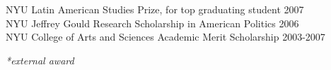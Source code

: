 \documentclass[11pt]{article}
\begin{document}
	\begin{minipage}[t]{.21\textwidth}
	  \so{ }
	\end{minipage}
	\begin{minipage}[t]{.79\textwidth}
	NYU Latin American Studies Prize, for top graduating student 			\hfill 2007 \\
	NYU Jeffrey Gould Research Scholarship in American Politics 			\hfill 2006 \\
	NYU College of Arts and Sciences Academic Merit Scholarship			\hfill 2003-2007 \\
	\vspace{-.2in}

	\emph{*\scriptsize external award}	\\

\end{minipage}
\end{document}
